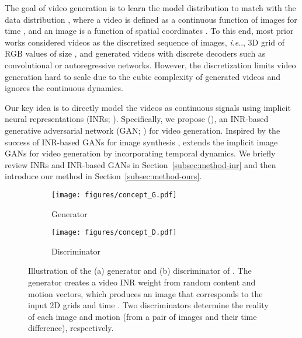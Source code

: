 \documentclass{article} \usepackage{iclr2022_conference,times}
\makeatletter
\DeclareRobustCommand\onedot{\futurelet\@let@token\@onedot}
\def\@onedot{\ifx\@let@token.\else.\null\fi\xspace}
\def\ie{\emph{i.e}\onedot} \def\Ie{\emph{I.e}\onedot}
\makeatother
\begin{document}
The goal of video generation is to learn the model distribution  to match with the data distribution , where a video  is defined as a continuous function of images  for time , and an image  is a function of spatial coordinates . To this end, most prior works considered videos as the discretized sequence of images, \ie, 3D grid of RGB values of size , and generated videos with discrete decoders such as convolutional \citep{tian2021good} or autoregressive \citep{yan2021videogpt} networks. However, the discretization limits video generation hard to scale due to the cubic complexity of generated videos and ignores the continuous dynamics.

Our key idea is to directly model the videos as continuous signals using implicit neural representations (INRs; \citet{sitzmann2020implicit,tancik2020fourier}). Specifically, we propose \emph{\lname} (\sname), an INR-based generative adversarial network (GAN; \citet{goodfellow2014generative}) for video generation. Inspired by the success of INR-based GANs for image synthesis \citep{skorokhodov2021adversarial,anokhin2021image}, \sname extends the implicit image GANs for video generation by incorporating temporal dynamics. We briefly review INRs and INR-based GANs in Section~\ref{subsec:method-inr} and then introduce our method \sname in Section~\ref{subsec:method-ours}.

\begin{figure*}[t]
\centering\small
\vspace{-0.1in}
\begin{subfigure}{0.45\textwidth}
\texttt{[image: figures/concept\_G.pdf]}
\caption{
Generator
}\label{fig:concept_G}
\end{subfigure}
\begin{subfigure}{0.45\textwidth}
\texttt{[image: figures/concept\_D.pdf]}
\caption{
Discriminator
}\label{fig:concept_D}
\end{subfigure}
\vspace{-0.05in}
\caption{
Illustration of the (a) generator and (b) discriminator of \sname. The generator creates a video INR weight from random content and motion vectors, which produces an image that corresponds to the input 2D grids  and time . Two discriminators determine the reality of each image and motion (from a pair of images and their time difference), respectively.
}\label{fig:concept}
\vspace{-0.15in}
\end{figure*}

 
\end{document}
